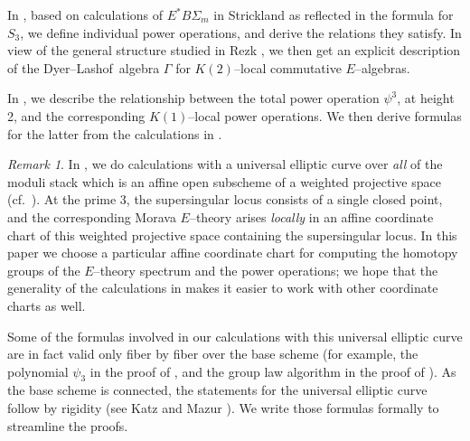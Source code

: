 \documentclass[microtype]{gtpart}     %
\theoremstyle{remark}
\newtheorem{rmk}{Remark}[section]
\theoremstyle{definition}
\newcommand{\DL}{Dyer--Lashof~}
\newcommand{\G}{\Gamma}
\newcommand{\p}{\psi^3}
\begin{document}
In , based on calculations of $E^* B\Sigma_m$ in 
Strickland \cite{Str98} as reflected in the formula for $S_3$, we define 
individual power operations, and derive the relations they satisfy.  In view 
of the general structure studied in Rezk \cite{cong}, we then get an explicit 
description of the \DL algebra $\G$ for $K(2)$--local commutative 
$E$--algebras.  

In , we describe the relationship between the total power 
operation $\p$, at height 2, and the corresponding $K(1)$--local power 
operations.  We then derive formulas for the latter from the calculations in 
.  

\begin{rmk}
\label{rmk:grading}
 In , we do calculations with a universal elliptic curve 
 over {\em all} of the moduli stack which is an affine open subscheme of a 
 weighted projective space (cf.~).  At the prime 3, the 
 supersingular locus consists of a single closed point, and the corresponding 
 Morava $E$--theory arises {\em locally} in an affine coordinate chart of 
 this weighted projective space containing the supersingular locus.  In this 
 paper we choose a particular affine coordinate chart for computing the 
 homotopy groups of the $E$--theory spectrum and the power operations; we 
 hope that the generality of the calculations in  makes it 
 easier to work with other coordinate charts as well.  

 Some of the formulas involved in our calculations with this universal 
 elliptic curve are in fact valid only fiber by fiber over the base scheme 
 (for example, the polynomial $\psi_3$ in the proof of , 
 and the group law algorithm in the proof of ).  As the 
 base scheme is connected, the statements for the universal elliptic curve 
 follow by rigidity (see Katz and Mazur \cite[Section 2.4]{KM}).  We write 
 those formulas formally to streamline the proofs.  
\end{rmk}
\end{document}
